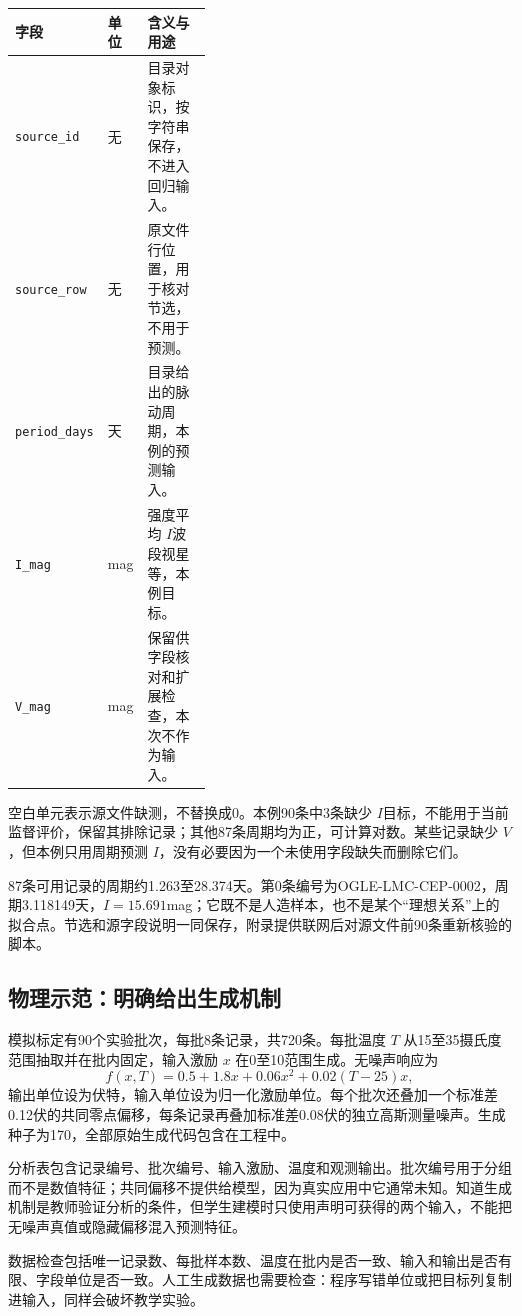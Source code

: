 \begin{center}\small
\begin{tabularx}{\linewidth}{p{0.24\linewidth}p{0.15\linewidth}X}\toprule
字段&单位&含义与用途\\\midrule
\texttt{source\_id}&无&目录对象标识，按字符串保存，不进入回归输入。\\
\texttt{source\_row}&无&原文件行位置，用于核对节选，不用于预测。\\
\texttt{period\_days}&天&目录给出的脉动周期，本例的预测输入。\\
\texttt{I\_mag}&mag&强度平均 $I$波段视星等，本例目标。\\
\texttt{V\_mag}&mag&保留供字段核对和扩展检查，本次不作为输入。\\\bottomrule
\end{tabularx}\end{center}

空白单元表示源文件缺测，不替换成0。本例90条中3条缺少 $I$目标，不能用于当前监督评价，保留其排除记录；其他87条周期均为正，可计算对数。某些记录缺少 $V$，但本例只用周期预测 $I$，没有必要因为一个未使用字段缺失而删除它们。

87条可用记录的周期约1.263至28.374天。第0条编号为OGLE-LMC-CEP-0002，周期3.118149天，$I=15.691$mag；它既不是人造样本，也不是某个“理想关系”上的拟合点。节选和源字段说明一同保存，附录提供联网后对源文件前90条重新核验的脚本。

\subsection{物理示范：明确给出生成机制}
模拟标定有90个实验批次，每批8条记录，共720条。每批温度 $T$ 从15至35摄氏度范围抽取并在批内固定，输入激励 $x$ 在0至10范围生成。无噪声响应为
\begin{equation}
f(x,T)=0.5+1.8x+0.06x^2+0.02(T-25)x,
\label{eq:project-calibration}
\end{equation}
输出单位设为伏特，输入单位设为归一化激励单位。每个批次还叠加一个标准差0.12伏的共同零点偏移，每条记录再叠加标准差0.08伏的独立高斯测量噪声。生成种子为170，全部原始生成代码包含在工程中。

分析表包含记录编号、批次编号、输入激励、温度和观测输出。批次编号用于分组而不是数值特征；共同偏移不提供给模型，因为真实应用中它通常未知。知道生成机制是教师验证分析的条件，但学生建模时只使用声明可获得的两个输入，不能把无噪声真值或隐藏偏移混入预测特征。

数据检查包括唯一记录数、每批样本数、温度在批内是否一致、输入和输出是否有限、字段单位是否一致。人工生成数据也需要检查：程序写错单位或把目标列复制进输入，同样会破坏教学实验。

